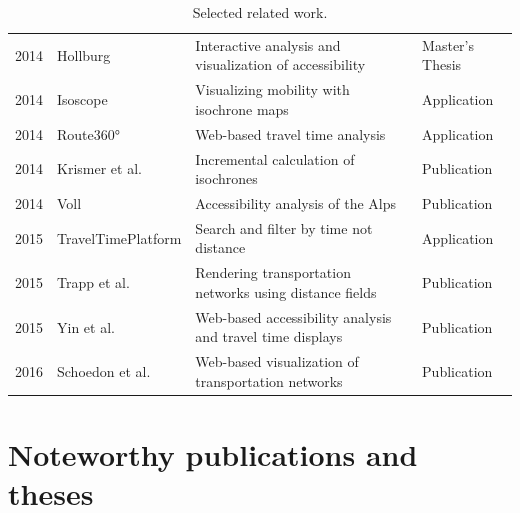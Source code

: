 \begin{table}[htp]
\begin{tabular}{r|l|l|l}
      2014 & Hollburg \cite{Hollburg2014} & Interactive analysis and visualization of accessibility & Master's Thesis \\
      2014 & Isoscope \cite{Isoscope} & Visualizing mobility with isochrone maps & Application \\
      2014 & Route360° \cite{Route360} & Web-based travel time analysis & Application \\
      2014 & Krismer et al. \cite{krismer2014incremental} & Incremental calculation of isochrones & Publication \\
      2014 & Voll \cite{vollerreichbarkeiten} & Accessibility analysis of the Alps & Publication \\
      2015 & TravelTimePlatform \cite{TravelTimePlatform} & Search and filter by time not distance & Application \\
      2015 & Trapp et al. \cite{Trapp2015} & Rendering transportation networks using distance fields & Publication \\
      2015 & Yin et al. \cite{Yin2015} & Web-based accessibility analysis and travel time displays & Publication \\
      2016 & Schoedon et al. \cite{STHD2016} & Web-based visualization of transportation networks & Publication \\
    \end{tabular}
    \caption{Selected related work.}
    \label{tab:overv:relat}
  \end{table}

  \section{Noteworthy publications and theses}
    \label{sec:overv:publc}

